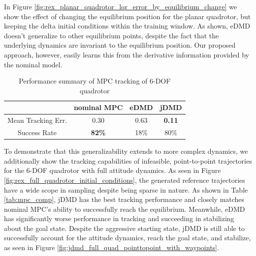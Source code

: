 \documentclass{article}
\begin{document}
In Figure \ref{fig:rex_planar_quadrotor_lqr_error_by_equilibrium_change} we show the effect 
of changing the equilibrium position for the planar quadrotor, but keeping the delta initial
conditions within the training window. As shown, eDMD doesn't generalize to other
equilibrium points, despite the fact that the underlying dynamics are invariant to the
equilibrium position. Our proposed approach, however, easily learns this from the derivative
information provided by the nominal model.

\begin{table}
	\vspace{-2\baselineskip}
	\begin{tabular}{cccc}\\
		\toprule  
								& {\color{black} \textbf{nominal MPC}} & {\color{orange} \textbf{eDMD}} & {\textbf{\color{cyan} jDMD}} \\
		\midrule
		Mean Tracking Err.		& 0.30			& 0.63 	& \textbf{0.11} \\
		Success Rate 			& \textbf{82\%} & 18\%	& 80\% \\
		\bottomrule
	\end{tabular}
	\caption{Performance summary of MPC tracking of 6-DOF quadrotor}
	\vspace{-1\baselineskip}
	\label{tab:full_quad_tracking_mpc}
\end{table} 

To demonstrate that this generalizability extends to more complex dynamics, we additionally 
show the tracking capabilities of infeasible, point-to-point trajectories for the 6-DOF quadrotor
with full attitude dynamics. As seen in Figure \ref{fig:rex_full_quadrotor_initial_conditions}, the generated
reference trajectories have a wide scope in sampling despite being sparse in nature. As shown in
Table \ref{tab:mpc_comp}, jDMD has the best tracking performance and closely matches nominal MPC's ability to
successfully reach the equilibrium. Meanwhile, eDMD has significantly worse performance in tracking and succeeding
in stabilizing about the goal state.  Despite the aggressive starting state, jDMD is still able to successfully
account for the attitude dynamics, reach the goal state, and stabilize, as seen in Figure \ref{fig:jdmd_full_quad_pointtopoint_with_waypoints}.
\end{document}
